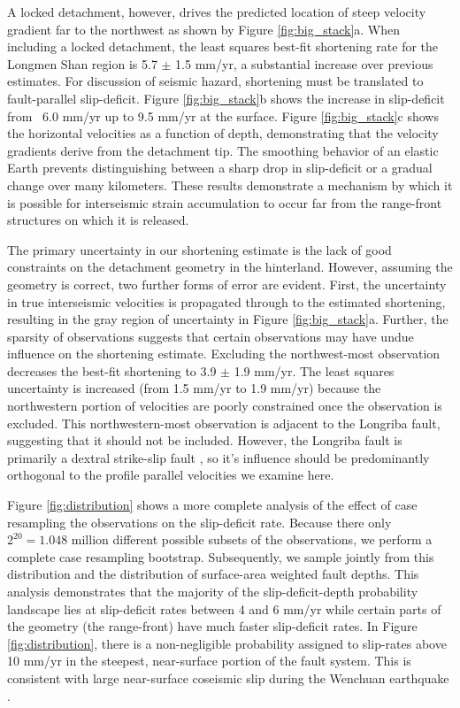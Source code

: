 \documentclass[12pt]{article}
\begin{document}
A locked detachment, however, drives the predicted location of steep velocity gradient far to the northwest as shown by Figure \ref{fig:big_stack}a. When including a locked detachment, the least squares best-fit shortening rate for the Longmen Shan region is 5.7 $\pm$ 1.5 mm/yr, a substantial increase over previous estimates. For discussion of seismic hazard, shortening must be translated to fault-parallel slip-deficit. Figure \ref{fig:big_stack}b shows the increase in slip-deficit from ~6.0 mm/yr up to 9.5 mm/yr at the surface. Figure \ref{fig:big_stack}c shows the horizontal velocities as a function of depth, demonstrating that the velocity gradients derive from the detachment tip. The smoothing behavior of an elastic Earth prevents distinguishing between a sharp drop in slip-deficit or a gradual change over many kilometers. These results demonstrate a mechanism by which it is possible for interseismic strain accumulation to occur far from the range-front structures on which it is released.

The primary uncertainty in our shortening estimate is the lack of good constraints on the detachment geometry in the hinterland. However, assuming the geometry is correct, two further forms of error are evident. First, the uncertainty in true interseismic velocities is propagated through to the estimated shortening, resulting in the gray region of uncertainty in Figure \ref{fig:big_stack}a. Further, the sparsity of observations suggests that certain observations may have undue influence on the shortening estimate. Excluding the northwest-most observation decreases the best-fit shortening to 3.9 $\pm$ 1.9 mm/yr. The least squares uncertainty is increased (from 1.5 mm/yr to 1.9 mm/yr) because the northwestern portion of velocities are poorly constrained once the observation is excluded. This northwestern-most observation is adjacent to the Longriba fault, suggesting that it should not be included. However, the Longriba fault is primarily a dextral strike-slip fault \citep{Ren2013}, so it's influence should be predominantly orthogonal to the profile parallel velocities we examine here.

Figure \ref{fig:distribution} shows a more complete analysis of the effect of case resampling the observations on the slip-deficit rate. Because there only $2^{20} = 1.048 $ million different possible subsets of the observations, we perform a complete case resampling bootstrap. Subsequently, we sample jointly from this distribution and the distribution of surface-area weighted fault depths. This analysis demonstrates that the majority of the slip-deficit-depth probability landscape lies at slip-deficit rates between 4 and 6 mm/yr while certain parts of the geometry (the range-front) have much faster slip-deficit rates. In Figure \ref{fig:distribution}, there is a non-negligible probability assigned to slip-rates above 10 mm/yr in the steepest, near-surface portion of the fault system. This is consistent with large near-surface coseismic slip during the Wenchuan earthquake \citep{Shen2009}. 
\end{document}
